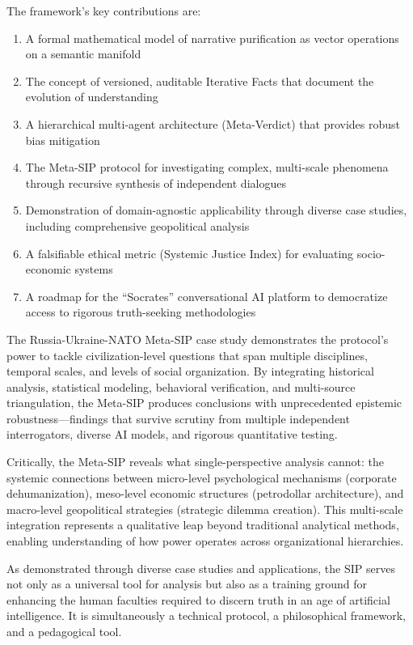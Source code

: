 \documentclass[11pt,a4paper]{article}
\begin{document}
\begin{small}
The framework's key contributions are:
\begin{enumerate}[leftmargin=*]
    \item A formal mathematical model of narrative purification as vector operations on a semantic manifold
    \item The concept of versioned, auditable Iterative Facts that document the evolution of understanding
    \item A hierarchical multi-agent architecture (Meta-Verdict) that provides robust bias mitigation
    \item The Meta-SIP protocol for investigating complex, multi-scale phenomena through recursive synthesis of independent dialogues
    \item Demonstration of domain-agnostic applicability through diverse case studies, including comprehensive geopolitical analysis
    \item A falsifiable ethical metric (Systemic Justice Index) for evaluating socio-economic systems
    \item A roadmap for the ``Socrates'' conversational AI platform to democratize access to rigorous truth-seeking methodologies
\end{enumerate}

The Russia-Ukraine-NATO Meta-SIP case study demonstrates the protocol's power to tackle civilization-level questions that span multiple disciplines, temporal scales, and levels of social organization. By integrating historical analysis, statistical modeling, behavioral verification, and multi-source triangulation, the Meta-SIP produces conclusions with unprecedented epistemic robustness---findings that survive scrutiny from multiple independent interrogators, diverse AI models, and rigorous quantitative testing.

Critically, the Meta-SIP reveals what single-perspective analysis cannot: the systemic connections between micro-level psychological mechanisms (corporate dehumanization), meso-level economic structures (petrodollar architecture), and macro-level geopolitical strategies (strategic dilemma creation). This multi-scale integration represents a qualitative leap beyond traditional analytical methods, enabling understanding of how power operates across organizational hierarchies.

As demonstrated through diverse case studies and applications, the SIP serves not only as a universal tool for analysis but also as a training ground for enhancing the human faculties required to discern truth in an age of artificial intelligence. It is simultaneously a technical protocol, a philosophical framework, and a pedagogical tool.


\end{small}
\end{document}

